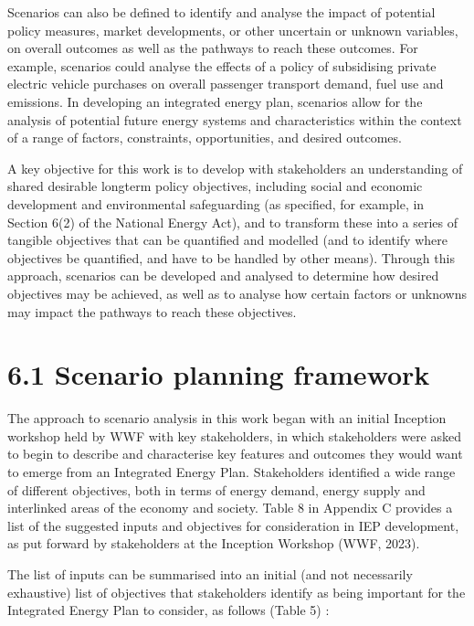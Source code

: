 \documentclass[letterpaper,10pt,english]{jupyterBook}
\begin{document}
\sphinxAtStartPar
Scenarios can also be defined to identify and analyse the impact of potential policy measures, market developments, or other uncertain or unknown variables, on overall outcomes as well as the pathways to reach these outcomes. For example, scenarios could analyse the effects of a policy of subsidising private electric vehicle purchases on overall passenger transport demand, fuel use and emissions. In developing an integrated energy plan, scenarios allow for the analysis of potential future energy systems and characteristics within the context of a range of factors, constraints, opportunities, and desired outcomes.

\sphinxAtStartPar
A key objective for this work is to develop with stakeholders an understanding of shared desirable long\sphinxhyphen{}term policy objectives, including social and economic development and environmental safeguarding (as specified, for example, in Section 6(2) of the National Energy Act), and to transform these into a series of tangible objectives that can be quantified and modelled (and to identify where objectives  be quantified, and have to be handled by other means). Through this approach, scenarios can be developed and analysed to determine how desired objectives may be achieved, as well as to analyse how certain factors or unknowns may impact the pathways to reach these objectives.


\section{6.1 Scenario planning framework}
\label{\detokenize{06Scenariodevelopment:scenario-planning-framework}}
\sphinxAtStartPar
The approach to scenario analysis in this work began with an initial Inception workshop held by WWF with key stakeholders, in which stakeholders were asked to begin to describe and characterise key features and outcomes they would want to emerge from an Integrated Energy Plan. Stakeholders identified a wide range of different objectives, both in terms of energy demand, energy supply and interlinked areas of the economy and society. Table 8 in Appendix C provides a list of the suggested inputs and objectives for consideration in IEP development, as put forward by stakeholders at the Inception Workshop (WWF, 2023).

\sphinxAtStartPar
The list of inputs can be summarised into an initial (and not necessarily exhaustive) list of objectives that stakeholders identify as being important for the Integrated Energy Plan to consider, as follows (Table 5) :
\end{document}
